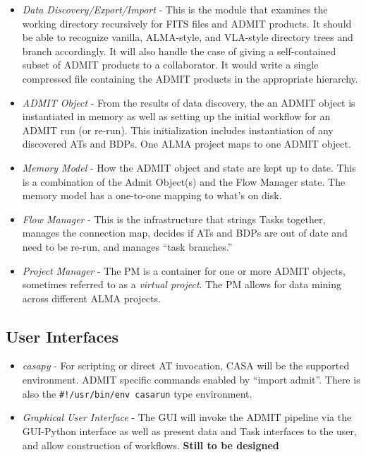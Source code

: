 \documentclass[preprint]{aastex}
\begin{document}
\begin{itemize}
\item {\it Data Discovery/Export/Import} - This is the module that examines
the working directory recursively for FITS files and ADMIT products.
It should be able to recognize vanilla, ALMA-style, and VLA-style directory
trees and branch accordingly.  It will also handle the case of giving
a self-contained subset of ADMIT products to a collaborator. It would
write a single compressed file containing the ADMIT products in the
appropriate hierarchy.  

\item {\it ADMIT Object} - From the results of data discovery, 
the an ADMIT object is instantiated in memory as well as setting up
the initial workflow for an ADMIT run (or re-run).  This initialization
includes instantiation of any discovered ATs and BDPs.  One ALMA project
maps to one ADMIT object.

\item {\it Memory Model} - How the ADMIT object and state are kept up to date.
This is a combination of the Admit Object(s) and the Flow Manager state.
The memory model has a one-to-one mapping to what's on disk.

\item {\it Flow Manager } - This is the infrastructure that
strings Tasks together, manages the connection map, decides if ATs and
BDPs are out of date and need to be re-run, and manages ``task branches.''  

\item {\it Project Manager } -  The PM is a container for one or more
ADMIT objects, sometimes referred to as a {\it virtual project}.  The PM
allows for data mining across different ALMA projects.  

\end{itemize}


\subsection{User Interfaces}
\begin{itemize}
\item {\it casapy} - For scripting or direct AT invocation, CASA will be
the supported environment.  ADMIT specific commands enabled
by ``import admit''. There is also the {\tt \#!/usr/bin/env casarun}
type environment.


\item {\it Graphical User Interface} - The GUI will invoke the ADMIT
pipeline via the GUI-Python interface as well as present data and Task
interfaces to the user, and allow construction of workflows.  {\bf Still
to be designed} 
\end{itemize}
\clearpage
\end{document}
